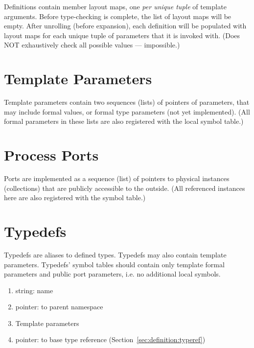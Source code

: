 Definitions contain member layout maps, 
one \emph{per unique tuple} of template arguments.  
Before type-checking is complete, the list of layout maps will be empty.  
After unrolling (before expansion), 
each definition will be populated with layout maps for each 
unique tuple of parameters that it is invoked with.  
(Does NOT exhaustively check all possible values --- impossible.)

\section{Template Parameters}
\label{sec:definition:template}

Template parameters contain two sequences (lists) of pointers of parameters, 
that may include formal values, 
or formal type parameters (not yet implemented).  
(All formal parameters in these lists are also 
registered with the local symbol table.)  

\section{Process Ports}
\label{sec:definition:ports}

Ports are implemented as a sequence (list) of pointers to 
physical instances (collections) that are publicly accessible to the outside.  
(All referenced instances here are also registered with the symbol table.)  

\section{Typedefs}
\label{sec:definition:typedef}

Typedefs are aliases to defined types.  
Typedefs may also contain template parameters.  
Typedefs' symbol tables should contain only template formal parameters
	and public port parameters, i.e. no additional local symbols.  

\begin{enumerate}
\item string: name
\item pointer: to parent namespace
\item Template parameters
\item pointer: to base type reference (Section~\ref{sec:definition:typeref})
\end{enumerate}

